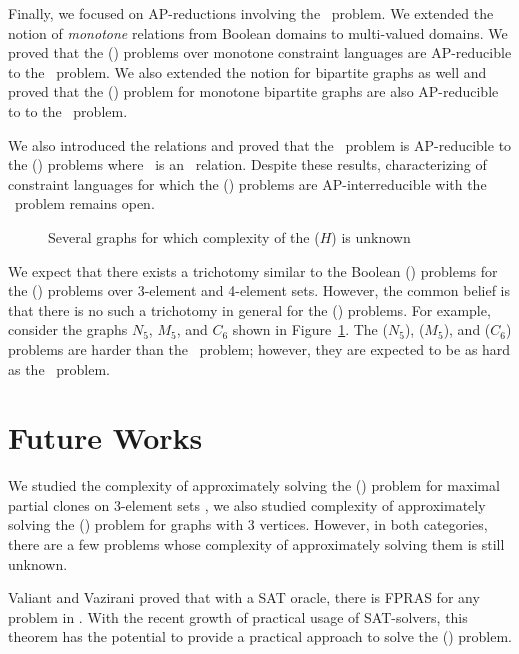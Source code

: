 Finally, we focused on AP-reductions involving the \cbis\ problem.
We extended the notion of \emph{monotone} relations from Boolean domains to 
multi-valued domains. We proved that the \ccsp(\mrelset) problems 
over monotone constraint languages
are AP-reducible to the \cbis\ problem. We also extended the notion
for bipartite graphs as well and proved that the \chom(\mH) problem 
for monotone bipartite graphs are also AP-reducible to to the \cbis\ problem.

We also introduced the \emph{\RBA} relations and proved that the \cbis\ problem is
AP-reducible to the \ccsp(\mR) problems where \mR\ is an \RBA\ relation.
Despite these results, characterizing of constraint languages for which 
the \ccsp(\mrelset) problems are AP-interreducible with the \cbis\ problem remains open.

\begin{figure}
\centering
\subfigure[\ensuremath{N_5}]{\label{fig:n5}}\hfill
\subfigure[\ensuremath{M_5}]{\label{fig:m5}}\hfill
\subfigure[\ensuremath{C_6}]{\label{fig:c6}}
\caption{Several graphs for which complexity of the \chom(\ensuremath{H}) is unknown}
\label{fig:unknown}
\end{figure}

We expect that there exists a trichotomy similar to the Boolean \ccsp(\mrelset) problems
for the \ccsp(\mrelset) problems over 3-element and 4-element sets.
However, the common belief is that there is no such a trichotomy in general for
the \ccsp(\mrelset) problems.
For example, consider the graphs \(N_5\), \(M_5\), and \(C_6\) shown in Figure~\ref{fig:unknown}.
The \chom(\(N_5\)), \chom(\(M_5\)), and \chom(\(C_6\)) problems are harder than
the \cbis\ problem; however, they are expected to be as hard as the \csat\ problem.

\section{Future Works}
We studied the complexity of approximately solving 
the \ccsp(\mrelset) problem for maximal partial clones on
3-element sets \cite{mvl}, we also studied complexity of approximately solving 
the \chom(\mH) problem for graphs with 3 vertices. However, in both categories,
there are a few problems whose complexity of approximately solving them is still unknown.

Valiant and Vazirani \cite{valvaz} proved that with a SAT oracle, there is FPRAS for any 
problem in \cp\@. With the recent growth of practical usage of SAT-solvers, this theorem
has the potential to provide a practical approach to solve the \ccsp(\mrelset) problem.

